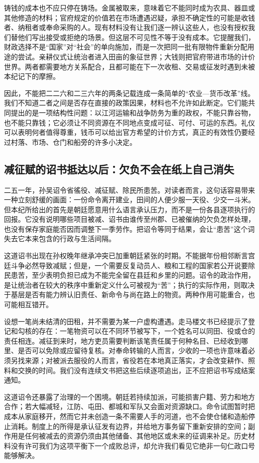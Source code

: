 铸钱的成本也不应只停在铸场。金属被取来，意味着它不能同时成为农具、器皿或其他修造的材料；官府规定的价值若在市场遭遇迟疑，承担不确定性的可能是收钱者、纳租者或奉命采购的人。现有材料没有让我们逐一辨认这些人，也没有授权我们替他们写出接受或拒绝的场景。但这层不可见性不等于没有成本。它提醒我们，财政选择不是“国家”对“社会”的单向施加，而是一次把同一批有限物件重新分配用途的尝试。亲耕仪式让统治者进入田亩的象征世界；大钱则把官府带进市场的计价世界。两者都需要地方关系配合，且都可能在下一次收租、交易或征发时遇到未被本纪记下的摩擦。

因此，不能把二二六和二三六年的两条记载连成一条简单的“农业—货币改革”线。我们不知道二者之间是否存在直接的政策因果，材料也不允许如此断定。它们能共同提出的是一项结构性问题：以江河运输和战争防务为重的政权，不能只靠谷物，也不能只靠钱；它必须让不同资源在不同地点变成可征、可付、可运的东西。礼仪可以表明何者值得尊重，钱币可以给出官方希望的计价方式，真正的有效性仍要经过村落、市场、仓门和船旁的许多小决定。

\subsection{减征赋的诏书抵达以后：欠负不会在纸上自己消失}
二五一年，孙吴诏令省徭役、减征赋、除民所患苦。对读者而言，这句话容易带来一种立刻舒缓的画面：一份命令离开建业，田间的人便少服一天役、少交一斗米。但本纪所给出的首先是朝廷愿意用什么语言承认压力，而不是一份各县逐项执行的回报。它没有说明哪些项目被减、诏书由谁传至州郡、已被催纳的欠负怎样处理，也没有保存家庭能否因而调整下一季劳作。把诏令等同于结果，会让“患苦”这个词失去它本来包含的行政与生活间隔。

这道诏书出现在孙权晚年继承冲突已加重朝廷紧张的时期。不能据年份相邻断言宫廷斗争必然导致减赋；但是，一个需要反复动员人、粮和工程的国家若公开说要除民患苦，至少表明负担已成为不能完全留在县廷和乡里的问题。诏令的政治作用，是让统治者在较大的秩序中重新定义什么可被视为“苦”；执行的实际作用，则取决于基层是否有能力辨认旧责任、新命令与尚在路上的物资。两种作用可能重合，也可能相互错开。

设想一笔尚未结清的田租，并不需要为某一户虚构遭遇。走马楼文书已经提示了登记和勾核的存在：一笔物资可以在不同环节被写下，一个姓名可以同田、役或仓的责任相连。减征到来时，地方吏员需要判断该笔责任属于何种名目、已经收到哪里、是否可以免除或应留待复核。对奉命转输的人而言，少收的一项也许意味着必须另找来源；对被派去服役的人而言，省役若在本地真正落实，才会改变耕作、照料和交换的时间。我们没有连续文书把这些后续逐项追出，正不应把诏书写成结案通知。

这道诏令还暴露了治理的一个困境。朝廷若持续加派，可能损害户籍、劳力和地方合作；若大幅减轻，江防、屯田、都城和军队又会面对资源缺口。命令试图暂时把成本从家庭移开，然而它并未创造一条不需要人手的河道，也不会使仓储和造船停止消耗。制度上的所得是承认征发有边界，并给地方事务留下重新安排的空间；副作用是任何被减去的资源仍须由其他储备、其他地区或未来的征调来补足。历史材料没有许可我们为这项平衡下一个成败总评，却允许我们看见它绝非一句仁政口号能够解决。

